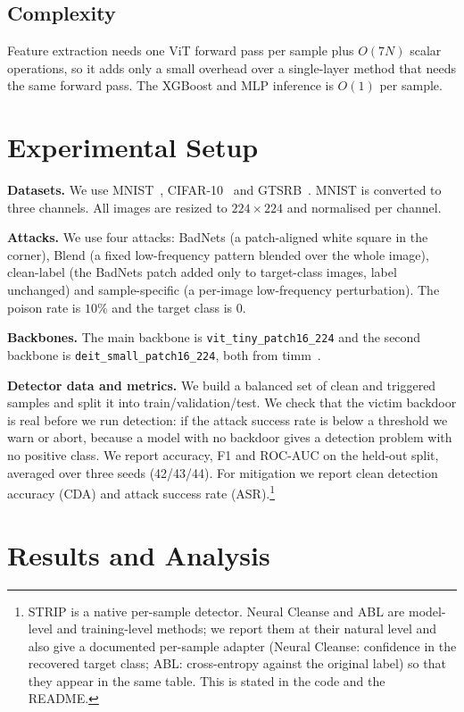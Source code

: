 \documentclass[journal]{IEEEtran}
\begin{document}
\subsection{Complexity}
Feature extraction needs one ViT forward pass per sample plus $O(7N)$ scalar
operations, so it adds only a small overhead over a single-layer method that
needs the same forward pass. The XGBoost and MLP inference is $O(1)$ per sample.

\section{Experimental Setup}
\textbf{Datasets.} We use MNIST~\cite{lecun1998mnist},
CIFAR-10~\cite{krizhevsky2009cifar} and GTSRB~\cite{stallkamp2011gtsrb}. MNIST is
converted to three channels. All images are resized to $224\times224$ and
normalised per channel.

\textbf{Attacks.} We use four attacks: BadNets (a patch-aligned white square in
the corner), Blend (a fixed low-frequency pattern blended over the whole image),
clean-label (the BadNets patch added only to target-class images, label
unchanged) and sample-specific (a per-image low-frequency perturbation). The
poison rate is $10\%$ and the target class is $0$.

\textbf{Backbones.} The main backbone is \texttt{vit\_tiny\_patch16\_224} and
the second backbone is \texttt{deit\_small\_patch16\_224}, both from
timm~\cite{wightman2019timm}.

\textbf{Detector data and metrics.} We build a balanced set of clean and
triggered samples and split it into train/validation/test. We check that the
victim backdoor is real before we run detection: if the attack success rate is
below a threshold we warn or abort, because a model with no backdoor gives a
detection problem with no positive class. We report accuracy, F1 and ROC-AUC on
the held-out split, averaged over three seeds (42/43/44).
For mitigation we report
clean detection accuracy (CDA) and attack success rate (ASR).\footnote{STRIP is
a native per-sample detector. Neural Cleanse and ABL are model-level and
training-level methods; we report them at their natural level and also give a
documented per-sample adapter (Neural Cleanse: confidence in the recovered
target class; ABL: cross-entropy against the original label) so that they appear
in the same table. This is stated in the code and the README.}

\section{Results and Analysis}
\end{document}
